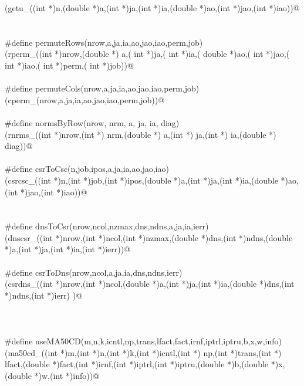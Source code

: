 \documentclass[12pt]{article}
\begin{document}
\begin{flushleft}
\begin{minipage}{\linewidth}
\begin{list}{}{}
\mbox{}\verb@(getu_((int *)n,(double *)a,(int *)ja,(int *)ia,(double *)ao,(int *)jao,(int *)iao))@\\
\mbox{}\verb@@\\
\mbox{}\verb@@\\
\mbox{}\verb@#define permuteRows(nrow,a,ja,ia,ao,jao,iao,perm,job) \@\\
\mbox{}\verb@(rperm_((int *)nrow,(double *) a,( int *)ja,( int *)ia,( double *)ao,( int *)jao,( int *)iao,( int *)perm,( int *)job))@\\
\mbox{}\verb@@\\
\mbox{}\verb@#define permuteCols(nrow,a,ja,ia,ao,jao,iao,perm,job) \@\\
\mbox{}\verb@(cperm_(nrow,a,ja,ia,ao,jao,iao,perm,job))@\\
\mbox{}\verb@@\\
\mbox{}\verb@#define normsByRow(nrow, nrm, a, ja, ia, diag) \@\\
\mbox{}\verb@(rnrms_((int *)nrow,(int *) nrm,(double *) a,(int *) ja,(int *) ia,(double *) diag))@\\
\mbox{}\verb@@\\
\mbox{}\verb@#define csrToCsc(n,job,ipos,a,ja,ia,ao,jao,iao) \@\\
\mbox{}\verb@ (csrcsc_((int *)n,(int *)job,(int *)ipos,(double *)a,(int *)ja,(int *)ia,(double *)ao,(int *)jao,(int *)iao))@\\
\mbox{}\verb@@\\
\mbox{}\verb@@\\
\mbox{}\verb@#define dnsToCsr(nrow,ncol,nzmax,dns,ndns,a,ja,ia,ierr)\@\\
\mbox{}\verb@(dnscsr_((int *)nrow,(int *)ncol,(int *)nzmax,(double *)dns,(int *)ndns,(double *)a,(int *)ja,(int *)ia,(int *)ierr))@\\
\mbox{}\verb@@\\
\mbox{}\verb@#define csrToDns(nrow,ncol,a,ja,ia,dns,ndns,ierr) \@\\
\mbox{}\verb@(csrdns_((int *)nrow,(int *)ncol,(double *)a,(int *)ja,(int *)ia,(double *)dns,(int *)ndns,(int *)ierr) )@\\
\mbox{}\verb@@\\
\mbox{}\verb@@\\
\mbox{}\verb@@\\
\mbox{}\verb@#define useMA50CD(m,n,k,icntl,np,trans,lfact,fact,irnf,iptrl,iptru,b,x,w,info)\@\\
\mbox{}\verb@(ma50cd_((int *)m,(int *)n,(int *)k,(int *)icntl,(int *) np,(int *)trans,(int *) lfact,(double *)fact,(int *)irnf,(int *)iptrl,(int *)iptru,(double *)b,(double *)x,(double *)w,(int *)info))@\\

\end{list}
\end{minipage}
\end{flushleft}
\end{document}
